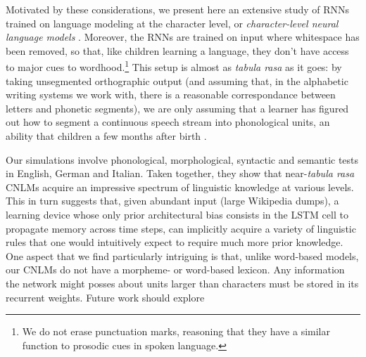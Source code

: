 Motivated by these considerations, we present here an extensive study
of RNNs trained on language modeling at the character level, or
\emph{character-level neural language models}
\cite[CNLMs,][]{Mikolov:etal:2011,Sutskever:etal:2011,Graves:2014}. Moreover,
the RNNs are trained on input where whitespace has been removed, so
that, like children learning a language, they don't have access to
major cues to wordhood.\footnote{We do not erase punctuation marks,
  reasoning that they have a similar function to prosodic cues in
  spoken language.} This setup is almost as \emph{tabula rasa} as it
goes: by taking unsegmented orthographic output (and assuming that, in
the alphabetic writing systems we work with, there is a reasonable
correspondance between letters and phonetic segments), we are only
assuming that a learner has figured out how to segment a continuous
speech stream into phonological units, an ability that children a few
months after birth \cite[e.g.,][]{Maye:etal:2002,Kuhl:2004}.

Our simulations involve phonological, morphological, syntactic and
semantic tests in English, German and Italian. Taken together, they
show that near-\emph{tabula rasa} CNLMs acquire an impressive spectrum
of linguistic knowledge at various levels.  This in turn suggests
that, given abundant input (large Wikipedia dumps), a learning device
whose only prior architectural bias consists in the LSTM cell to
propagate memory across time steps, can implicitly acquire a variety
of linguistic rules that one would intuitively expect to require much
more prior knowledge. One aspect that we find particularly intriguing
is that, unlike word-based models, our CNLMs do not have a morpheme-
or word-based lexicon. Any information the network might posses about
units larger than characters must be stored in its recurrent
weights. Future work should explore 


